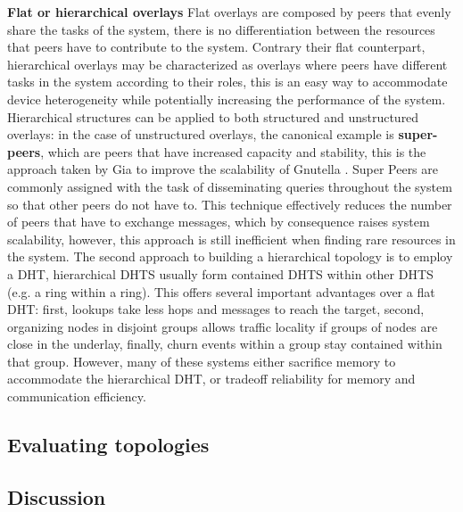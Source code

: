 \textbf{Flat or hierarchical overlays} Flat overlays are composed by peers that evenly share the tasks of the system, there is no differentiation between the resources that peers have to contribute to  the system. Contrary their flat counterpart, hierarchical overlays may be characterized as overlays where peers have different tasks in the system according to their roles, this is an easy way to accommodate device heterogeneity while potentially increasing the performance of the system. Hierarchical structures can be applied to both structured and unstructured overlays: in the case of unstructured overlays, the canonical example is \textbf{super-peers}, which are peers that have increased capacity and stability, this is the approach taken by Gia \cite{Chawathe2003} to improve the scalability of Gnutella \cite{gnutella_gtk}. Super Peers are commonly assigned with the task of disseminating queries throughout the system so that other peers do not have to. This technique effectively reduces the number of peers that have to exchange messages, which by consequence raises system scalability, however, this approach is still inefficient when finding rare resources in the system. The second approach to building a hierarchical topology is to employ a DHT, hierarchical DHTS usually form contained DHTS within other DHTS (e.g. a ring within a ring). This offers several important advantages over a flat DHT: first, lookups take less hops and messages to reach the target, second, organizing nodes in disjoint groups allows traffic locality if groups of nodes are close in the underlay, finally, churn events within a group stay contained within that group. However, many of these systems either sacrifice memory to accommodate the hierarchical DHT, or tradeoff reliability for memory and communication efficiency.

\subsection{Evaluating topologies}

\subsection{Discussion}
